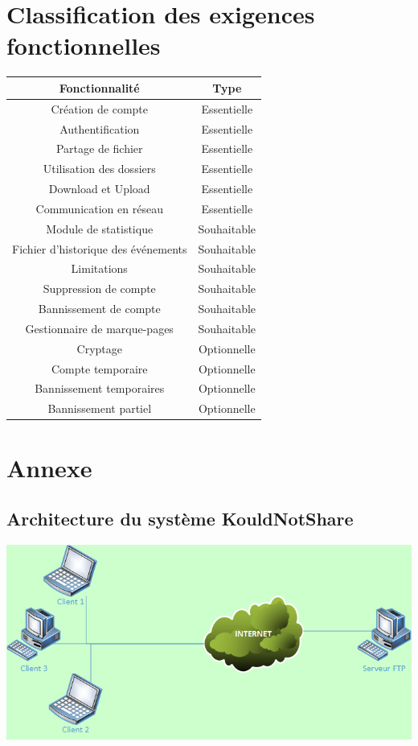 \documentclass[10pt,a4paper]{report}
\begin{document}
\section{Classification des exigences fonctionnelles}
\bgroup
\def\arraystretch{1.5}
\begin{tabular}{|c|c|}
	\hline
	{\large \textbf{Fonctionnalité}} & {\large \textbf{Type}}\\
	\hline
	Création de compte & Essentielle\\
	\hline
	Authentification & Essentielle\\
	\hline
	Partage de fichier & Essentielle \\
	\hline
	Utilisation des dossiers & Essentielle\\
	\hline
	Download et Upload & Essentielle \\
	\hline
	Communication en réseau & Essentielle \\
	\hline
	Module de statistique & Souhaitable \\
	\hline
	Fichier d'historique des événements & Souhaitable \\
	\hline
	Limitations & Souhaitable\\
	\hline
	Suppression de compte & Souhaitable \\
	\hline
	Bannissement de compte & Souhaitable \\
	\hline
	Gestionnaire de marque-pages & Souhaitable\\
	\hline
	Cryptage & Optionnelle\\
	\hline
	Compte temporaire & Optionnelle \\
	\hline
	Bannissement temporaires & Optionnelle \\
	\hline
	Bannissement partiel & Optionnelle \\
	\hline
\end{tabular}
\egroup

\section{Annexe}
\subsection{Architecture du système KouldNotShare}
\begin{center}
\includegraphics[scale=0.8]{Ressources/doc_exigence.png}
\end{center}
\end{document}
